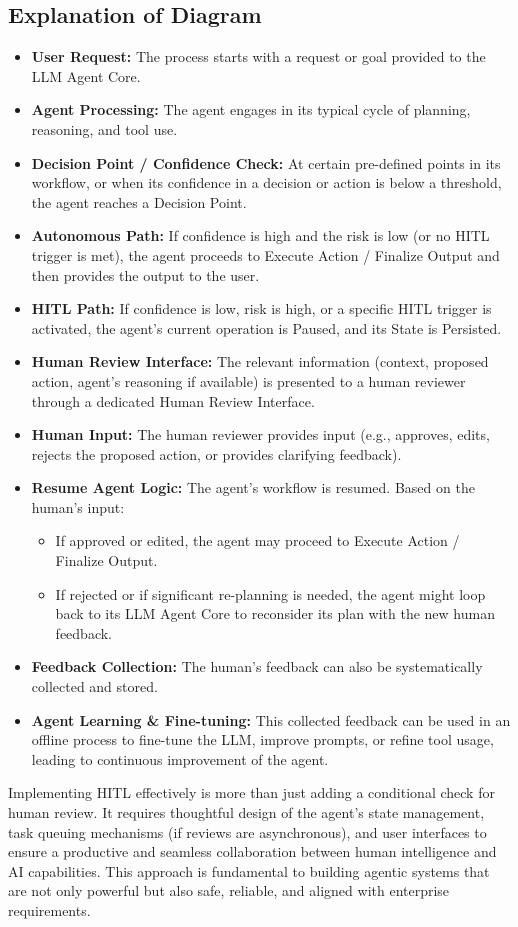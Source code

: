 \subsection*{Explanation of Diagram}
\begin{itemize}
    \item \textbf{User Request:} The process starts with a request or goal provided to the LLM Agent Core.
    \item \textbf{Agent Processing:} The agent engages in its typical cycle of planning, reasoning, and tool use.
    \item \textbf{Decision Point / Confidence Check:} At certain pre-defined points in its workflow, or when its confidence in a decision or 
    action is below a threshold, the agent reaches a Decision Point.
    \item \textbf{Autonomous Path:} If confidence is high and the risk is low (or no HITL trigger is met), the agent proceeds to 
    Execute Action / Finalize Output and then provides the output to the user.
    \item \textbf{HITL Path:} If confidence is low, risk is high, or a specific HITL trigger is activated, the agent's current operation is Paused, 
    and its State is Persisted.
    \item \textbf{Human Review Interface:} The relevant information (context, proposed action, agent's reasoning if available) is 
    presented to a human reviewer through a dedicated Human Review Interface.
    \item \textbf{Human Input:} The human reviewer provides input (e.g., approves, edits, rejects the proposed action, or provides 
    clarifying feedback).
    \item \textbf{Resume Agent Logic:} The agent's workflow is resumed. Based on the human's input:
    \begin{itemize}
        \item If approved or edited, the agent may proceed to Execute Action / Finalize Output.
        \item If rejected or if significant re-planning is needed, the agent might loop back to its LLM Agent Core to reconsider its plan 
        with the new human feedback.
    \end{itemize}
    \item \textbf{Feedback Collection:} The human's feedback can also be systematically collected and stored.
    \item \textbf{Agent Learning \& Fine-tuning:} This collected feedback can be used in an offline process to fine-tune the LLM, improve prompts, 
    or refine tool usage, leading to continuous improvement of the agent.
\end{itemize}
Implementing HITL effectively is more than just adding a conditional check for human review. It requires thoughtful design of the agent's 
state management, task queuing mechanisms (if reviews are asynchronous), and user interfaces to ensure a productive and seamless collaboration 
between human intelligence and AI capabilities. This approach is fundamental to building agentic systems that are not only powerful but also 
safe, reliable, and aligned with enterprise requirements.
